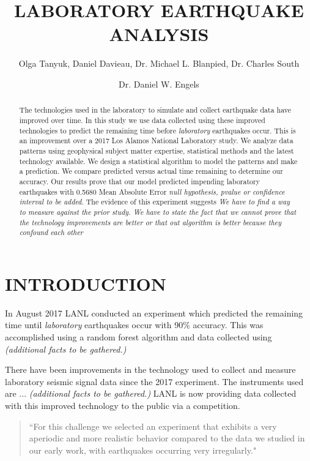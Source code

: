 \documentclass[]{llncs}
\begin{document}

\title{LABORATORY EARTHQUAKE ANALYSIS}

\author{Olga Tanyuk, Daniel Davieau, Dr. Michael L. Blanpied, Dr. Charles South \and Dr. Daniel W. Engels}


\maketitle

\begin{abstract}
The technologies used in the laboratory to simulate and collect earthquake data have improved over time. In this study we use data collected using these improved technologies to predict the remaining time before {\em laboratory} earthquakes occur. This is an improvement over a 2017 Los Alamos National Laboratory study\cite{Bertrand}.  We analyze data patterns using geophysical subject matter expertise, statistical methods and the latest technology available. We design a statistical algorithm to model the patterns and make a prediction. We compare predicted versus actual time remaining to determine our accuracy.
Our results prove that our model predicted impending laboratory earthquakes with 0.5680 Mean Absolute Error {\em null hypothesis, pvalue or confidence interval to be added}.
The evidence of this experiment suggests {\em We have to find a way to measure against the prior study. We have to state the fact that we cannot prove that the technology improvements are better or that out algorithm is better because they confound each other}

\end{abstract}
\section{INTRODUCTION}
In August 2017 LANL conducted an experiment\cite{Bertrand} which predicted the remaining time until \emph{laboratory} earthquakes occur with 90\% accuracy. This was accomplished using a random forest algorithm and data collected using {\em (additional facts to be gathered.)} \par 
There have been improvements in the technology used to collect and measure laboratory seismic signal data since the 2017 experiment. The instruments used are ... {\em (additional facts to be gathered.)} LANL is now providing data collected with this improved technology to the public via a competition. \par
\begin{quote}
	“For this challenge we selected an experiment that exhibits a very aperiodic and more realistic behavior compared to the data we studied in our early work, with earthquakes occurring very irregularly.\cite{kaggle}" 
\end{quote}
\end{document}
